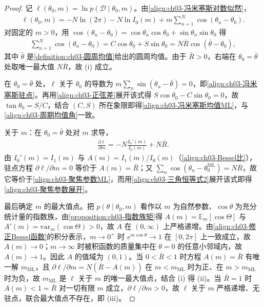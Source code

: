 \documentclass[../../main.tex]{subfiles}
\begin{document}
\begin{proof}
记 $\ell(\theta_0,m)=\ln p(\mathcal{D}\mid\theta_0,m)$。由\eqref{align:ch03-冯米塞斯对数似然}，
\begin{align*}
\ell(\theta_0,m)=-N\ln(2\pi)-N\ln I_0(m)+m\sum_{n=1}^{N}\cos(\theta_n-\theta_0).
\end{align*}
对固定的 $m>0$，用 $\cos(\theta_n-\theta_0)=\cos\theta_n\cos\theta_0+\sin\theta_n\sin\theta_0$ 得
\begin{align*}
\sum_{n=1}^{N}\cos(\theta_n-\theta_0)=C\cos\theta_0+S\sin\theta_0=N\bar{R}\cos(\bar{\theta}-\theta_0),
\end{align*}
其中 $\bar{\theta}$ 是\cref{definition:ch03-圆周均值}给出的圆周均值。由于 $\bar{R}>0$，右端在 $\theta_0=\bar{\theta}$ 处取唯一最大值 $N\bar{R}$，故 (i) 成立。

在 $\theta_0=\bar{\theta}$ 处，$\ell$ 关于 $\theta_0$ 的导数为 $m\sum_n\sin(\theta_n-\bar{\theta})=0$，即\eqref{align:ch03-冯米塞斯驻点}。再用\eqref{align:ch03-正弦差}展开该式得 $S\cos\theta_0-C\sin\theta_0=0$，故 $\tan\theta_0=S/C$，结合 $(C,S)$ 所在象限即得\eqref{align:ch03-冯米塞斯均值ML}，与\eqref{align:ch03-周期均值角}一致。

关于 $m$：在 $\theta_0=\bar{\theta}$ 处对 $m$ 求导，
\begin{align*}
\frac{\partial\ell}{\partial m}=-N\frac{I_0'(m)}{I_0(m)}+N\bar{R}.
\end{align*}
由 $I_0'(m)=I_1(m)$ 与 $A(m)=I_1(m)/I_0(m)$（\eqref{align:ch03-Bessel比}），驻点方程 $\partial\ell/\partial m=0$ 等价于 $A(m)=\bar{R}$；又 $\sum_n\cos(\theta_n-\theta_0^{\mathrm{ML}})=N\bar{R}$，故它等价于\eqref{align:ch03-聚焦参数ML}，而用\eqref{align:ch03-三角恒等式2}展开该式即得\eqref{align:ch03-聚焦参数展开}。

最后确定 $m$ 的最大值点。把 $p(\theta\mid\theta_0,m)$ 看作以 $m$ 为自然参数、$\cos\theta$ 为充分统计量的指数族，由\cref{proposition:ch03-指数族矩}得 $A(m)=\mathbb{E}_{m}[\cos\Theta]$ 与 $A'(m)=\mathrm{var}_{m}(\cos\Theta)>0$，故 $A$ 在 $(0,\infty)$ 上严格递增。由\eqref{align:ch03-修正Bessel函数}的积分表示，$m\to0^{+}$ 时 $e^{m\cos\theta}\to1$ 在 $[0,2\pi]$ 上一致成立，故 $A(m)\to0$；$m\to\infty$ 时被积函数的质量集中在 $\theta=0$ 的任意小邻域内，故 $A(m)\to1$。因此 $A$ 的值域为 $(0,1)$。当 $0<\bar{R}<1$ 时方程 $A(m)=\bar{R}$ 有唯一解 $m_{\mathrm{ML}}$，且 $\partial\ell/\partial m=N(\bar{R}-A(m))$ 在 $m<m_{\mathrm{ML}}$ 时为正、在 $m>m_{\mathrm{ML}}$ 时为负，故 $m_{\mathrm{ML}}$ 是 $\ell$ 关于 $m$ 的唯一最大值点，结合 (i) 得 (ii)。当 $\bar{R}=1$ 时 $A(m)<1=\bar{R}$ 对一切有限 $m$ 成立，$\partial\ell/\partial m>0$，故 $\ell$ 关于 $m$ 严格递增、无驻点，联合最大值点不存在，即 (iii)。
\end{proof}
\end{document}
